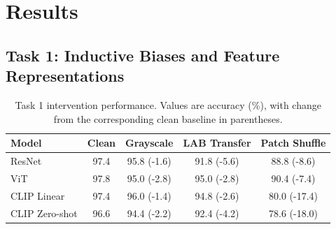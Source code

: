 \documentclass{article}
\begin{document}







\section{Results}
\label{sec:results}

\subsection{Task 1: Inductive Biases and Feature Representations}
\label{subsec:results-task1}


\begin{table}[t]
    \centering
    \caption{Task 1 intervention performance. Values are accuracy (\%), with change from the corresponding clean baseline in parentheses.}
    \label{tab:task1_interventions}
    \small
    \begin{tabular}{lcccc}
        \toprule
        Model & Clean & Grayscale & LAB Transfer & Patch Shuffle \\
        \midrule
        ResNet
        & 97.4
        & 95.8 (-1.6)
        & 91.8 (-5.6)
        & 88.8 (-8.6) \\

        ViT
        & 97.8
        & 95.0 (-2.8)
        & 95.0 (-2.8)
        & 90.4 (-7.4) \\

        CLIP Linear
        & 97.4
        & 96.0 (-1.4)
        & 94.8 (-2.6)
        & 80.0 (-17.4) \\

        CLIP Zero-shot
        & 96.6
        & 94.4 (-2.2)
        & 92.4 (-4.2)
        & 78.6 (-18.0) \\
        \bottomrule
    \end{tabular}
\end{table}
\end{document}
